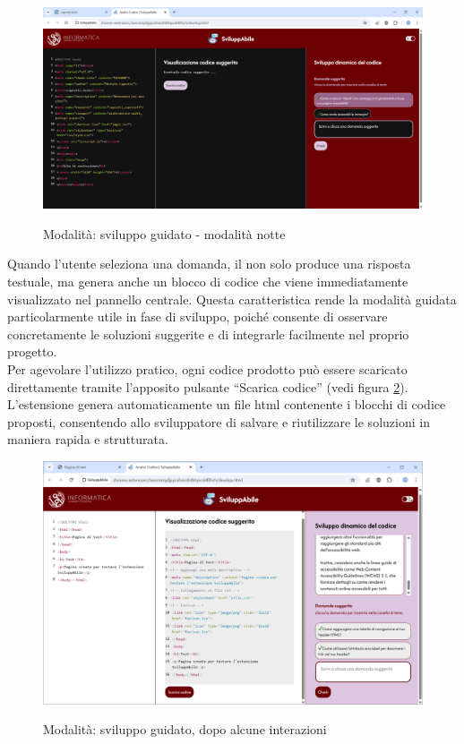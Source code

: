 \begin{figure}[H]
    \centering
    \includegraphics[width=1\linewidth, alt={Modalità di sviluppo guidato}]{img/mg_dark.png}
    \caption{Modalità: sviluppo guidato - modalità notte}\label{fig:mg_notte}
\end{figure}

\noindent Quando l’utente seleziona una domanda, il  non solo produce una risposta testuale, ma genera anche un blocco di codice che viene immediatamente visualizzato nel pannello centrale. Questa caratteristica rende la modalità guidata particolarmente utile in fase di sviluppo, poiché consente di osservare concretamente le soluzioni suggerite e di integrarle facilmente nel proprio progetto.\\
Per agevolare l’utilizzo pratico, ogni codice prodotto può essere scaricato direttamente tramite l’apposito pulsante “Scarica codice” (vedi figura \ref{fig:mg2}). L’estensione genera automaticamente un file \acrshort{html} contenente i blocchi di codice proposti, consentendo allo sviluppatore di salvare e riutilizzare le soluzioni in maniera rapida e strutturata.

\begin{figure}[H]
    \centering
    \includegraphics[width=1\linewidth, alt={Modalità di sviluppo guidato, dopo un'interazione}]{img/mg2.png}
    \caption{Modalità: sviluppo guidato, dopo alcune interazioni}\label{fig:mg2}
\end{figure}

